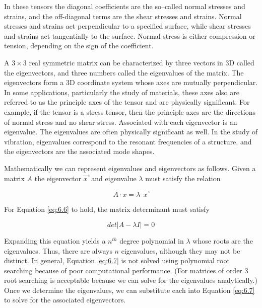 In these tensors the diagonal coefficients are the so--called normal stresses and strains, and the off-diagonal terms are the shear stresses and strains. Normal stresses and strains act perpendicular to a specified surface, while shear stresses and strains act tangentially to the surface. Normal stress is either compression or tension, depending on the sign of the coefficient.

A $3 \times 3$ real symmetric matrix can be characterized by three vectors in 3D called the eigenvectors, and three numbers called the eigenvalues of the matrix. The eigenvectors form a 3D coordinate system whose axes are mutually perpendicular. In some applications, particularly the study of materials, these axes also are referred to as the principle axes of the tensor and are physically significant. For example, if the tensor is a stress tensor, then the principle axes are the directions of normal stress and no shear stress. Associated with each eigenvector is an eigenvalue. The eigenvalues are often physically significant as well. In the study of vibration, eigenvalues correspond to the resonant frequencies of a structure, and the eigenvectors are the associated mode shapes.

Mathematically we can represent eigenvalues and eigenvectors as follows. Given a matrix $A$ the eigenvector $\overrightarrow{x\ }$ and eigenvalue $\lambda$ must satisfy the relation 

\begin{equation}\label{eq:6.6}
A \cdot x = \lambda\ \  \overrightarrow{x\ }
\end{equation}

\noindent For Equation \ref{eq:6.6} to hold, the matrix determinant must satisfy

\begin{equation}\label{eq:6.7}
det |A-\lambda I| = 0
\end{equation}

\noindent Expanding this equation yields a $n^{th}$ degree polynomial in $\lambda$ whose roots are the eigenvalues. Thus, there are always $n$ eigenvalues, although they may not be distinct. In general, Equation \ref{eq:6.7} is not solved using polynomial root searching because of poor computational performance. (For matrices of order 3 root searching is acceptable because we can solve for the eigenvalues analytically.) Once we determine the eigenvalues, we can substitute each into Equation \ref{eq:6.7} to solve for the associated eigenvectors.


